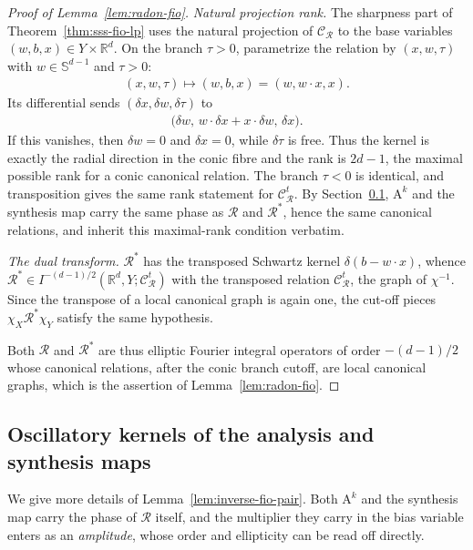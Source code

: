 \documentclass[12pt]{article}
\numberwithin{equation}{section}
\numberwithin{figure}{section}
\numberwithin{equation}{section}
\newcommand{\R}{\mathbb{R}}
\newcommand{\Sph}{\mathbb S}
\begin{document}
\begin{proof}[Proof of Lemma~\ref{lem:radon-fio}]
\emph{Natural projection rank.}
The sharpness part of Theorem~\ref{thm:sss-fio-lp} uses the natural projection of
$\mathcal{C}_{\mathcal R}$ to the base variables $(w,b,x)\in Y\times\R^d$.  On the branch
$\tau>0$, parametrize the relation by $(x,w,\tau)$ with $w\in\Sph^{d-1}$ and
$\tau>0$:
\begin{align*}
    (x,w,\tau)
    \longmapsto
    (w,b,x)=(w,w\cdot x,x).
\end{align*}
Its differential sends $(\delta x,\delta w,\delta\tau)$ to
\begin{align*}
    \bigl(\delta w,\, w\cdot\delta x+x\cdot\delta w,\,\delta x\bigr).
\end{align*}
If this vanishes, then $\delta w=0$ and $\delta x=0$, while $\delta\tau$ is free.
Thus the kernel is exactly the radial direction in the conic fibre and the rank is
$2d-1$, the maximal possible rank for a conic canonical relation.  The branch
$\tau<0$ is identical, and transposition gives the same rank statement for
$\mathcal{C}_{\mathcal R}^t$.  By Section~\ref{app:fio-composition}, $\mathrm{A}^k$ and the
synthesis map carry the same phase as $\mathcal R$ and $\mathcal R^*$, hence the same
canonical relations, and inherit this maximal-rank condition verbatim.

\emph{The dual transform.}  $\mathcal R^*$ has the transposed Schwartz kernel
$\delta(b-w\cdot x)$, whence $\mathcal R^*\in I^{-(d-1)/2}(\R^d,Y;\mathcal{C}_{\mathcal R}^t)$
with the transposed relation $\mathcal{C}_{\mathcal R}^t$, the graph of $\chi^{-1}$.  Since
the transpose of a local canonical graph is again one, the cut-off pieces
$\chi_X\mathcal R^*\chi_Y$ satisfy the same hypothesis.

Both $\mathcal R$ and $\mathcal R^*$ are thus elliptic Fourier integral operators
of order $-(d-1)/2$ whose canonical relations, after the conic branch cutoff, are
local canonical graphs, which is the assertion of Lemma~\ref{lem:radon-fio}.
\end{proof}

\subsection{Oscillatory kernels of the analysis and synthesis maps}
\label{app:fio-composition}

We give more details of Lemma~\ref{lem:inverse-fio-pair}.  Both $\mathrm{A}^k$ and
the synthesis map carry the phase of $\mathcal R$ itself, and the multiplier they carry
in the bias variable enters as an \emph{amplitude}, whose order and ellipticity can be
read off directly.
\end{document}
